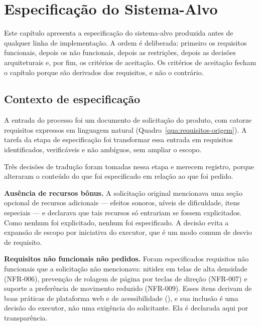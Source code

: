 
\chapter{Especificação do Sistema-Alvo}
\label{cap:especificacao}

Este capítulo apresenta a especificação do sistema-alvo produzida antes de
qualquer linha de implementação. A ordem é deliberada: primeiro os requisitos
funcionais, depois os não funcionais, depois as restrições, depois as decisões
arquiteturais e, por fim, os critérios de aceitação. Os critérios de aceitação
fecham o capítulo porque são derivados dos requisitos, e não o contrário.

\section{Contexto de especificação}
\label{sec:esp-contexto}

A entrada do processo foi um documento de solicitação do produto, com catorze
requisitos expressos em linguagem natural
(Quadro~\ref{qua:requisitos-origem}). A tarefa da etapa de especificação foi
transformar essa entrada em requisitos identificados, verificáveis e não
ambíguos, sem ampliar o escopo.

Três decisões de tradução foram tomadas nessa etapa e merecem registro, porque
alteraram o conteúdo do que foi especificado em relação ao que foi pedido.

\textbf{Ausência de recursos bônus.} A solicitação original mencionava uma seção
opcional de recursos adicionais --- efeitos sonoros, níveis de dificuldade, itens
especiais --- e declarava que tais recursos só entrariam se fossem explicitados.
Como nenhum foi explicitado, nenhum foi especificado. A decisão evita a expansão
de escopo por iniciativa do executor, que é um modo comum de desvio de requisito.

\textbf{Requisitos não funcionais não pedidos.} Foram especificados requisitos
não funcionais que a solicitação não mencionava: nitidez em telas de alta
densidade (NFR-006), prevenção de rolagem de página por teclas de direção
(NFR-007) e suporte a preferência de movimento reduzido (NFR-009). Esses itens
derivam de boas práticas de plataforma web e de acessibilidade
(), e sua inclusão é uma decisão do executor, não uma
exigência do solicitante. Ela é declarada aqui por transparência.

